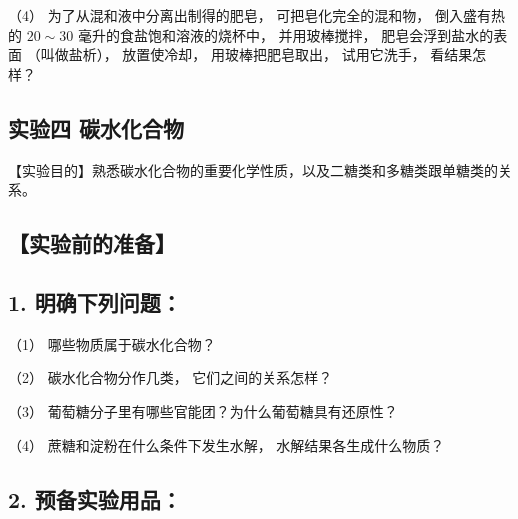 （4） 为了从混和液中分离出制得的肥皂， 可把皂化完全的混和物，
倒入盛有热的 \(20 \sim 30\) 毫升的食盐饱和溶液的烧杯中， 并用玻棒搅拌，
肥皂会浮到盐水的表面 （叫做盐析）， 放置使冷却， 用玻棒把肥皂取出，
试用它洗手， 看结果怎样？

\subsection{实验四 碳水化合物}

【实验目的】熟悉碳水化合物的重要化学性质，以及二糖类和多糖类跟单糖类的关系。

\subsection{【实验前的准备】}

\subsection{1. 明确下列问题：}

（1） 哪些物质属于碳水化合物？

（2） 碳水化合物分作几类， 它们之间的关系怎样？

（3） 葡萄糖分子里有哪些官能团？为什么葡萄糖具有还原性？

（4） 蔗糖和淀粉在什么条件下发生水解， 水解结果各生成什么物质？

\subsection{2. 预备实验用品：}

{\centering
\small\setlength{\tabcolsep}{3pt}%
\par
}

